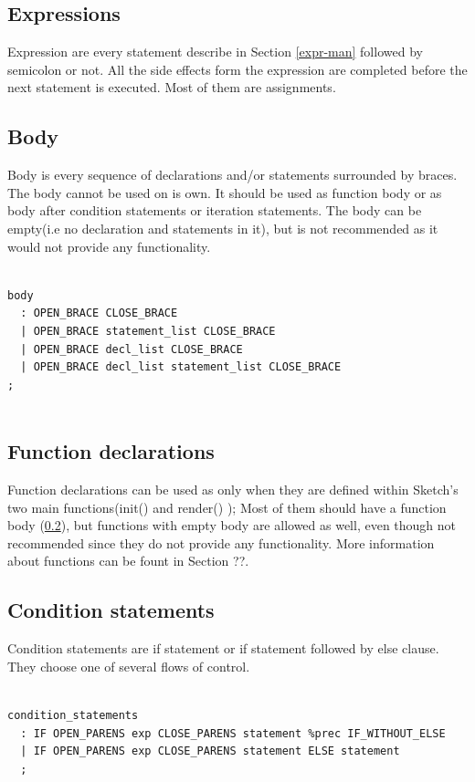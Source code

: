\documentclass{l3proj}
\begin{document}
\subsection{Expressions} 
Expression are every statement describe in Section \ref{expr-man} followed by semicolon or not. All the side effects form the expression are completed before the next statement is executed. Most of them are assignments. 

\subsection{Body}
\label{body}
Body is every sequence of declarations and/or statements surrounded by braces. The body cannot be used on is own. It should be used as  function body or as body after condition statements or iteration statements. The body can be empty(i.e no declaration and statements in it), but is not recommended as it would not provide any functionality. 
\begin{lstlisting}

body
  : OPEN_BRACE CLOSE_BRACE
  | OPEN_BRACE statement_list CLOSE_BRACE
  | OPEN_BRACE decl_list CLOSE_BRACE
  | OPEN_BRACE decl_list statement_list CLOSE_BRACE
;


\end{lstlisting}


\subsection{Function declarations}
Function declarations can be used as only when they are defined within Sketch's two main functions(init() and render() ); Most of them should have a function body (\ref{body}), but functions with empty body are allowed as well, even though not recommended since they do not provide any functionality. More information about functions can be fount in Section ??.

\subsection{Condition statements} 
Condition statements are if statement or if statement followed by else clause.  They choose one of several flows of control.
\begin{lstlisting}

condition_statements  
  : IF OPEN_PARENS exp CLOSE_PARENS statement %prec IF_WITHOUT_ELSE
  | IF OPEN_PARENS exp CLOSE_PARENS statement ELSE statement 
  ;
\end{lstlisting}
\end{document}
